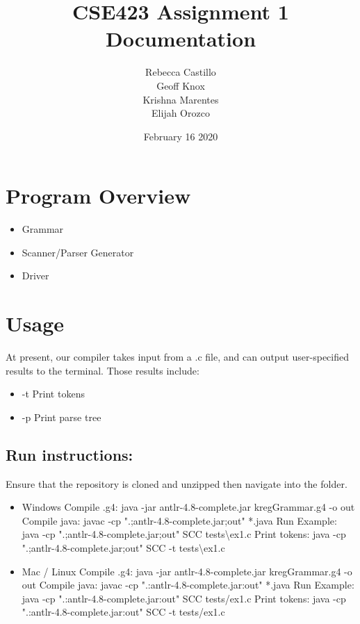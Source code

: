 \documentclass{article}
\title{CSE423 Assignment 1 Documentation}
\author{Rebecca Castillo\\Geoff Knox\\Krishna Marentes\\Elijah Orozco}
\date{February 16 2020}
\begin{document}
\maketitle

\section{Program Overview}
\begin{itemize}
    \item Grammar
    \item Scanner/Parser Generator
    \item Driver
\end{itemize}

\section{Usage}
At present, our compiler takes input from a .c file, and can output user-specified results to the terminal. Those results include:\\
\begin{itemize}
    \item -t Print tokens
    \item -p Print parse tree
\end{itemize}

\subsection{Run instructions:}
Ensure that the repository is cloned and unzipped then navigate into the folder.
\begin{itemize}
    \item Windows
        \subitem Compile .g4: java -jar antlr-4.8-complete.jar kregGrammar.g4 -o out
        \subitem Compile java: javac -cp ".;antlr-4.8-complete.jar;out" *.java
        \subitem Run Example: java -cp ".;antlr-4.8-complete.jar;out" SCC tests\textbackslash ex1.c
        \subitem Print tokens: java -cp ".;antlr-4.8-complete.jar;out" SCC -t tests\textbackslash ex1.c
    \item Mac / Linux
        \subitem Compile .g4: java -jar antlr-4.8-complete.jar kregGrammar.g4 -o out
        \subitem Compile java: javac -cp ".:antlr-4.8-complete.jar:out" *.java
        \subitem Run Example: java -cp ".:antlr-4.8-complete.jar:out" SCC tests/ex1.c
        \subitem Print tokens: java -cp ".:antlr-4.8-complete.jar:out" SCC -t tests/ex1.c
\end{itemize}
\end{document}
